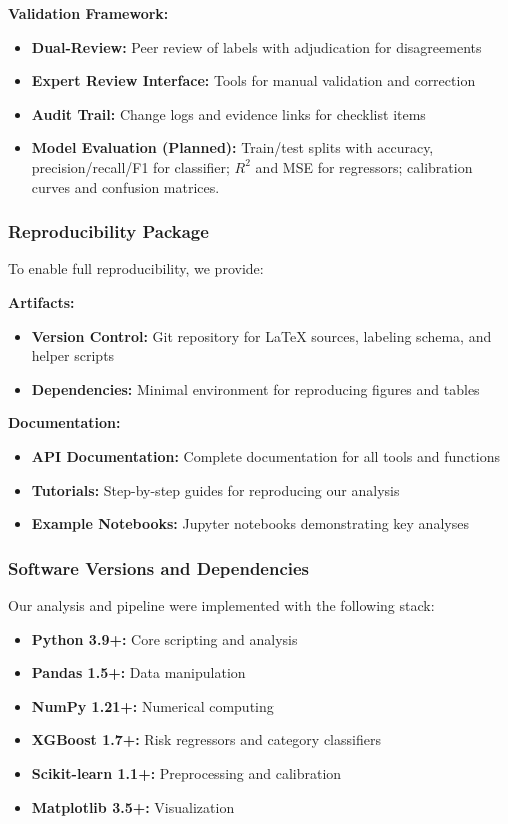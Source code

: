 \textbf{Validation Framework:}
\begin{itemize}
    \item \textbf{Dual-Review:} Peer review of labels with adjudication for disagreements
    \item \textbf{Expert Review Interface:} Tools for manual validation and correction
    \item \textbf{Audit Trail:} Change logs and evidence links for checklist items
    \item \textbf{Model Evaluation (Planned):} Train/test splits with accuracy, precision/recall/F1 for classifier; $R^2$ and MSE for regressors; calibration curves and confusion matrices.
\end{itemize}

\subsubsection{Reproducibility Package}
To enable full reproducibility, we provide:

\textbf{Artifacts:}
\begin{itemize}
    \item \textbf{Version Control:} Git repository for LaTeX sources, labeling schema, and helper scripts
    \item \textbf{Dependencies:} Minimal environment for reproducing figures and tables
\end{itemize}

\textbf{Documentation:}
\begin{itemize}
    \item \textbf{API Documentation:} Complete documentation for all tools and functions
    \item \textbf{Tutorials:} Step-by-step guides for reproducing our analysis
    \item \textbf{Example Notebooks:} Jupyter notebooks demonstrating key analyses
\end{itemize}

\subsubsection{Software Versions and Dependencies}
Our analysis and pipeline were implemented with the following stack:
\begin{itemize}
    \item \textbf{Python 3.9+:} Core scripting and analysis
    \item \textbf{Pandas 1.5+:} Data manipulation
    \item \textbf{NumPy 1.21+:} Numerical computing
    \item \textbf{XGBoost 1.7+:} Risk regressors and category classifiers
    \item \textbf{Scikit-learn 1.1+:} Preprocessing and calibration
    \item \textbf{Matplotlib 3.5+:} Visualization
\end{itemize}

